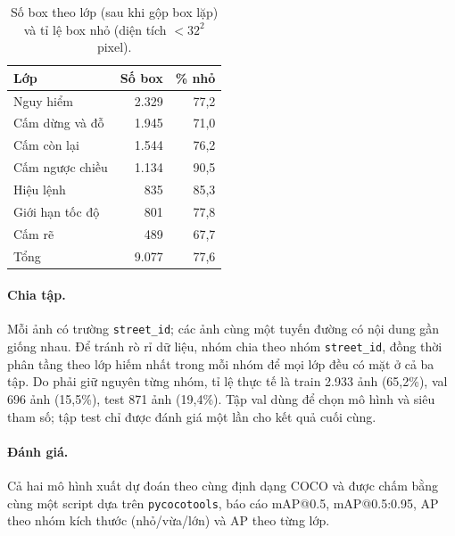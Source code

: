 \begin{table}[t]
\centering
\small
\begin{tabular}{lrr}
\hline
\textbf{Lớp} & \textbf{Số box} & \textbf{\% nhỏ} \\
\hline
Nguy hiểm        & 2.329 & 77,2 \\
Cấm dừng và đỗ   & 1.945 & 71,0 \\
Cấm còn lại      & 1.544 & 76,2 \\
Cấm ngược chiều  & 1.134 & 90,5 \\
Hiệu lệnh        &   835 & 85,3 \\
Giới hạn tốc độ  &   801 & 77,8 \\
Cấm rẽ           &   489 & 67,7 \\
\hline
Tổng             & 9.077 & 77,6 \\
\hline
\end{tabular}
\caption{Số box theo lớp (sau khi gộp box lặp) và tỉ lệ box nhỏ (diện tích $< 32^2$ pixel).}
\label{tab:eda}
\end{table}

\paragraph{Chia tập.} Mỗi ảnh có trường \texttt{street\_id}; các ảnh cùng một tuyến đường có nội dung gần giống nhau. Để tránh rò rỉ dữ liệu, nhóm chia theo nhóm \texttt{street\_id}, đồng thời phân tầng theo lớp hiếm nhất trong mỗi nhóm để mọi lớp đều có mặt ở cả ba tập. Do phải giữ nguyên từng nhóm, tỉ lệ thực tế là train 2.933 ảnh (65,2\%), val 696 ảnh (15,5\%), test 871 ảnh (19,4\%). Tập val dùng để chọn mô hình và siêu tham số; tập test chỉ được đánh giá một lần cho kết quả cuối cùng.

\paragraph{Đánh giá.} Cả hai mô hình xuất dự đoán theo cùng định dạng COCO và được chấm bằng cùng một script dựa trên \texttt{pycocotools}, báo cáo mAP@0.5, mAP@0.5:0.95, AP theo nhóm kích thước (nhỏ/vừa/lớn) và AP theo từng lớp.

